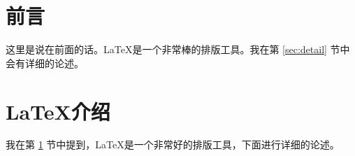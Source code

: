 \documentclass{ctexart}
\begin{document}
\tableofcontents
\section{前言}
\label{sec:introduction}
这里是说在前面的话。\LaTeX 是一个非常棒的排版工具。我在第 \ref{sec:detail} 节中会有详细的论述。
\section*{\LaTeX 介绍}
\label{sec:detail}
我在第 \ref{sec:introduction} 节中提到，\LaTeX 是一个非常好的排版工具，下面进行详细的论述。
\end{document}
